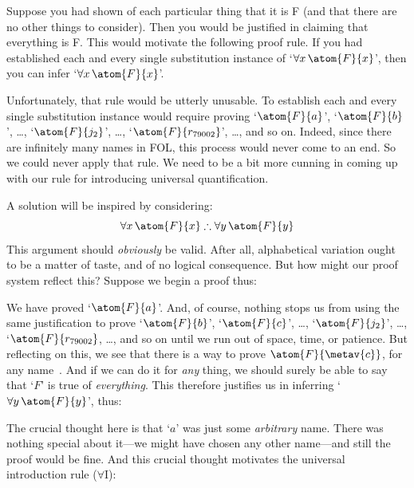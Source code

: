 Suppose you had shown of each particular thing that it is F (and that there are no other things to consider). Then you would be justified in claiming that everything is F. This would motivate the following proof rule. If you had established each and every single substitution instance of `$\forall x\,\atom{F}{x}$', then you can infer `$\forall x\,\atom{F}{x}$'.

Unfortunately, that rule would be utterly unusable. To establish each and every single substitution instance would require proving `$\atom{F}{a}$', `$\atom{F}{b}$', \dots, `$\atom{F}{j_2}$', \dots, `$\atom{F}{r_{79002}}$', \ldots, and so on. Indeed, since there are infinitely many names in FOL, this process would never come to an end. So we could never apply that rule. We need to be a bit more cunning in coming up with our rule for introducing universal quantification.

A solution will be inspired by considering:
$$\forall x\,\atom{F}{x} \therefore \forall y\,\atom{F}{y}$$
This argument should \emph{obviously} be valid. After all, alphabetical variation ought to be a matter of taste, and of no logical consequence. But how might our proof system reflect this? Suppose we begin a proof thus:
\begin{fitchproof}
	 \PR
	 
\end{fitchproof}
We have proved `$\atom{F}{a}$'. And, of course, nothing stops us from using the same justification to prove `$\atom{F}{b}$', `$\atom{F}{c}$', \ldots, `$\atom{F}{j_2}$', \ldots, `$\atom{F}{r_{79002}}$, \dots, and so on until we run out of space, time, or patience. But reflecting on this, we see that there is a way to prove $\atom{F}{\metav{c}}$, for any name~. And if we can do it for \emph{any} thing, we should surely be able to say that `$F$' is true of \emph{everything}. This therefore justifies us in inferring `$\forall y\,\atom{F}{y}$', thus:
\begin{fitchproof}
	\PR
	 
	 
\end{fitchproof}
The crucial thought here is that `$a$' was just some \emph{arbitrary} name. There was nothing special about it---we might have chosen any other name---and still the proof would be fine. And this crucial thought motivates the universal introduction rule ($\forall$I):


